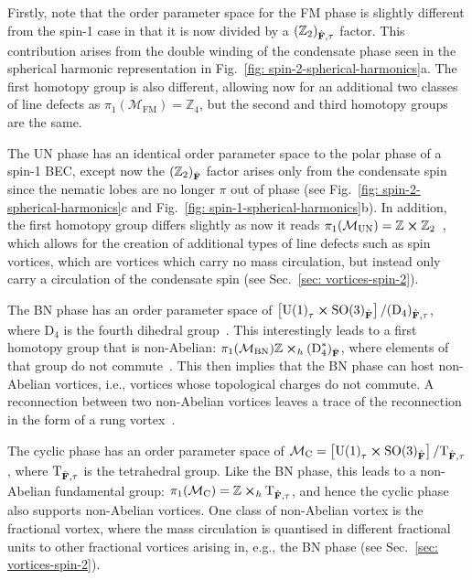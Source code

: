 Firstly, note that the order parameter space for the FM phase is slightly
different from the spin-1 case in that it is now divided by a
\({(\mathbb{Z}_2)}_{\hat{\vb{F}}, \tau}\) factor.
This contribution arises from the double winding of the condensate phase seen in
the spherical harmonic representation in
Fig.~\ref{fig: spin-2-spherical-harmonics}a.
The first homotopy group is also different, allowing now for an additional two
classes of line defects as \(\pi_1(\mathcal{M}_\text{FM}) = \mathbb{Z}_4\), but
the second and third homotopy groups are the same.

The UN phase has an identical order parameter space to the polar phase of a
spin-1 BEC, except now the \({(\mathbb{Z}_2)}_{\hat{\vb{F}}}\) factor arises
only from the condensate spin since the nematic lobes are no longer \(\pi \)
out of phase (see Fig.~\ref{fig: spin-2-spherical-harmonics}c and
Fig.~\ref{fig: spin-1-spherical-harmonics}b).
In addition, the first homotopy group differs slightly as now it reads
\(\pi_1(\mathcal{M}_\text{UN}) = \mathbb{Z} \cross
\mathbb{Z}_2\)~\cite{Kobayashi2012}, which allows for the creation of additional
types of line defects such as spin vortices, which are vortices which carry no
mass circulation, but instead only carry a circulation of the condensate spin
(see Sec.~\ref{sec: vortices-spin-2}).

The BN phase has an order parameter space of \(\left[{\text{U}(1)}_\tau \cross
{\text{SO}(3)}_{\hat{\vb{F}}}\right] / {(\text{D}_4)}_{\hat{\vb{F}}, \tau}\),
where \(\text{D}_4\) is the fourth dihedral group~\cite{Kobayashi2012}.
This interestingly leads to a first homotopy group that is non-Abelian:
\(\pi_1(\mathcal{M}_\text{BN})\mathbb{Z} \cross_h
{(\text{D}^\ast_4)}_{\hat{\vb{F}}}\), where elements of that group do not
commute~\cite{Mermin1979}.
This then implies that the BN phase can host non-Abelian vortices, i.e.,
vortices whose topological charges do not commute.
A reconnection between two non-Abelian vortices leaves a trace of the
reconnection in the form of a rung vortex~\cite{Mermin1979}.

The cyclic phase has an order parameter space of \(\mathcal{M}_\text{C} =
\left[{\text{U}(1)}_\tau \cross {\text{SO}(3)}_{\hat{\vb{F}}}\right]
/ \text{T}_{\hat{\vb{F}}, \tau}\), where \(\text{T}_{\hat{\vb{F}}, \tau}\) is
the tetrahedral group.
Like the BN phase, this leads to a non-Abelian fundamental group:
\(\pi_1(\mathcal{M}_\text{C}) = \mathbb{Z} \cross_h
\text{T}_{\hat{\vb{F}}, \tau}\), and hence the cyclic phase also supports
non-Abelian vortices.
One class of non-Abelian vortex is the fractional vortex, where the mass
circulation is quantised in different fractional units to other fractional
vortices arising in, e.g., the BN phase (see Sec.~\ref{sec: vortices-spin-2}).

